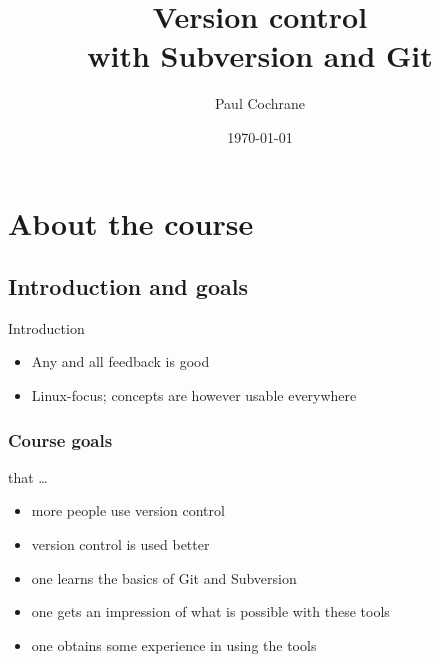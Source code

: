 \documentclass[10pt]{vcs_beamer}
\begin{document}
\author{Paul Cochrane}
\title[Version control with Subversion and Git]
        {Version control\\[0.2em]with Subversion and Git}
\date{\today}

\maketitle

\begin{frame}
\vspace*{-5mm}
\small
\begin{multicols}{2}
\begin{spacing}{0.8}
\tableofcontents
\end{spacing}
\vspace*{20mm}
\end{multicols}
\end{frame}


\section{About the course}

\subsection{Introduction and goals}
\begin{frame}{Introduction}
\begin{itemize}
    \item Any and all feedback is good
    \item Linux-focus; concepts are however usable everywhere
\end{itemize}


\end{frame}

\begin{frame}
\frametitle{Course goals}
that \ldots
\begin{itemize}
    \item more people use version control
    \item version control is used better
    \item one learns the basics of Git and Subversion
    \item one gets an impression of what is possible with these tools
    \item one obtains some experience in using the tools
\end{itemize}
\end{frame}
\end{document}
